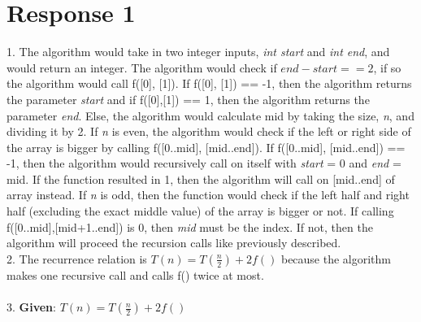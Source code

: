 \documentclass[12pt, a4paper]{article}
\begin{document}
\newenvironment{claim}[1]{\par\noindent\underline{Claim:}\space#1}{}
\newenvironment{basecase}[1]{\par\noindent\underline{Base Case:}\space#1}{}
\newenvironment{inductivehypothesis}[1]{\par\noindent\underline{Inductive Hypothesis:}\space#1}{}
\newenvironment{inductive}[1]{\par\noindent\underline{Inductive Case:}\space#1}{}
\newenvironment{guess}[1]{\par\noindent{Guess:}\space#1}{}
\newenvironment{prove}[1]{\par\noindent{Prove:}\space#1}{}
\maketitle
\section*{\centering Response 1}
    1. The algorithm would take in two integer inputs, \textit{int start} and \textit{int end}, and would return an integer.
    The algorithm would check if \(end - start == 2\), if so the algorithm would call f([0], [1]).
    If f([0], [1]) == -1, then the algorithm returns the parameter \textit{start} and if f([0],[1]) == 1, then the algorithm returns the parameter \textit{end}.
    Else, the algorithm would calculate mid by taking the size, \textit{n}, and dividing it by 2. 
    If \textit{n} is even, the algorithm would check if the left or right side of the array is bigger by calling f([0..mid], [mid..end]).
    If f([0..mid], [mid..end]) == -1, then the algorithm would recursively call on itself with \textit{start} = 0 and \textit{end} = mid.
    If the function resulted in 1, then the algorithm will call on [mid..end] of array instead.
    If \textit{n} is odd, then the function would check if the left half and right half (excluding the exact middle value) of the array is bigger or not.
    If calling f([0..mid],[mid+1..end]) is 0, then \textit{mid} must be the index. If not, then the algorithm will proceed the recursion calls like previously described.\\
    2. The recurrence relation is \(T(n) = T(\frac{n}{2}) + 2f()\) because the algorithm makes one recursive call and calls f() twice at most.\\
    \\
    3. \textbf{Given}: \(T(n) = T(\frac{n}{2}) + 2f()\)\\
    \\
\end{document}
